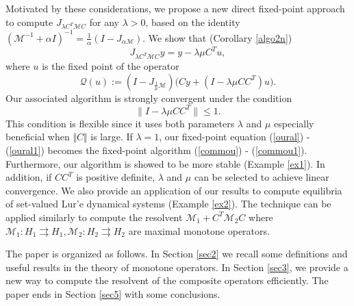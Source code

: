 \documentclass[11pt]{article}
\def\beq{\begin{equation}}
\def\eeq{\end{equation}}
\theoremstyle{plain}
\begin{document}
Motivated by these considerations, we propose a new direct fixed-point approach to compute $J_{\lambda C^T \mathcal{M} C}$ for any $\lambda > 0$, based on the identity $(\mathcal{M}^{-1} + \alpha I)^{-1} = \frac{1}{\alpha}(I - J_{\alpha \mathcal{M}})$. We show that (Corollary \ref{algo2n}) 
\begin{equation}\label{oural}
J_{\lambda C^T \mathcal{M} C} y = y - \lambda \mu C^T u,
\end{equation}
where $u$ is the fixed point of the operator 
\beq\label{oural1}
\mathcal{Q}(u) :=  (I - J_{\frac{1}{\mu} \mathcal{M}}) \Big(Cy + ( I - \lambda \mu CC^T) u\Big).
\eeq
 {Our associated algorithm is strongly convergent under the condition 
 \beq
 \| I - {\lambda}{\mu} CC^T \| \leq 1.
 \eeq} 
 This condition is flexible since it uses both parameters $\lambda$ and $\mu$ especially beneficial when $\Vert C \Vert$ is large. If $\lambda=1$, our fixed-point equation  (\ref{oural}) - (\ref{oural1}) becomes the  fixed-point algorithm (\ref{commou}) - (\ref{commou1}). Furthermore, our algorithm is showed to be more stable (Example \ref{ex1}).
 In addition, if $CC^T$ is positive definite, $\lambda$ and $\mu$ can be selected to achieve linear convergence.  We also provide an application of our results to compute  equilibria of set-valued Lur'e dynamical systems (Example \ref{ex2}). {The technique can be applied similarly to compute the resolvent $\mathcal{M}_1+C^T\mathcal{M}_2C$ where $\mathcal{M}_1:  H_1 \rightrightarrows H_1, \mathcal{M}_2:  H_2 \rightrightarrows H_2$ are maximal monotone operators. }



The paper is organized as follows.  In Section \ref{sec2}  we recall some definitions and useful results in the theory of monotone operators.  In Section \ref{sec3}, we provide a new way to compute the resolvent of the composite operators efficiently. The paper  ends in Section \ref{sec5} with some conclusions.
\end{document}
